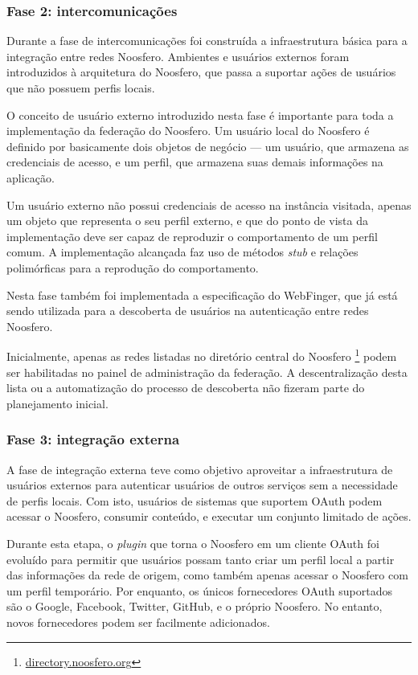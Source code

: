 \subsubsection{Fase 2: intercomunicações}

Durante a fase de intercomunicações foi construída a infraestrutura básica para a
integração entre redes Noosfero. Ambientes e usuários externos foram introduzidos à
arquitetura do Noosfero, que passa a suportar ações de usuários que não possuem
perfis locais.

O conceito de usuário externo introduzido nesta fase é importante para toda a
implementação da federação do Noosfero. Um usuário local do Noosfero é definido por
basicamente dois objetos de negócio --- um usuário, que armazena as credenciais de
acesso, e um perfil, que armazena suas demais informações na aplicação.

Um usuário externo não possui credenciais de acesso na instância visitada, apenas um
objeto que representa o seu perfil externo, e que do ponto de vista da implementação
deve ser capaz de reproduzir o comportamento de um perfil comum. A implementação
alcançada faz uso de métodos \textit{stub} e relações polimórficas para a reprodução
do comportamento.

Nesta fase também foi implementada a especificação do WebFinger, que já está sendo
utilizada para a descoberta de usuários na autenticação entre redes Noosfero.

Inicialmente, apenas as redes listadas no diretório central do Noosfero
\footnote{\url{directory.noosfero.org}} podem ser habilitadas no painel de
administração da federação. A descentralização desta lista ou a automatização do
processo de descoberta não fizeram parte do planejamento inicial.

\subsubsection{Fase 3: integração externa}

A fase de integração externa teve como objetivo aproveitar a infraestrutura de
usuários externos para autenticar usuários de outros serviços sem a necessidade de
perfis locais. Com isto, usuários de sistemas que suportem OAuth podem acessar o
Noosfero, consumir conteúdo, e executar um conjunto limitado de ações.

Durante esta etapa, o \textit{plugin} que torna o Noosfero em um cliente OAuth foi
evoluído para permitir que usuários possam tanto criar um perfil local a partir das
informações da rede de origem, como também apenas acessar o Noosfero com um perfil
temporário. Por enquanto, os únicos fornecedores OAuth suportados são o Google,
Facebook, Twitter, GitHub, e o próprio Noosfero. No entanto, novos fornecedores
podem ser facilmente adicionados.

